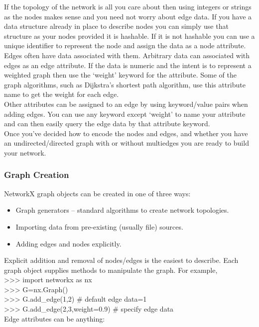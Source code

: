 If the topology of the network is all you care about then using integers or strings as the nodes makes sense and you need not worry about edge data. If you have a data structure already in place to describe nodes you can simply use that structure as your nodes provided it is hashable. If it is not hashable you can use a unique identifier to represent the node and assign the data as a node attribute.\\

Edges often have data associated with them. Arbitrary data can associated with edges as an edge attribute. If the data is numeric and the intent is to represent a weighted graph then use the ‘weight’ keyword for the attribute. Some of the graph algorithms, such as Dijkstra’s shortest path algorithm, use this attribute name to get the weight for each edge.\\

Other attributes can be assigned to an edge by using keyword/value pairs when adding edges. You can use any keyword except ‘weight’ to name your attribute and can then easily query the edge data by that attribute keyword.\\

Once you’ve decided how to encode the nodes and edges, and whether you have an undirected/directed graph with or without multiedges you are ready to build your network.\\

\subsubsection{Graph Creation}
NetworkX graph objects can be created in one of three ways:
\begin{itemize}
	\item Graph generators – standard algorithms to create network topologies.
	\item Importing data from pre-existing (usually file) sources.
	\item Adding edges and nodes explicitly.
\end{itemize}
Explicit addition and removal of nodes/edges is the easiest to describe. Each graph object supplies methods to manipulate the graph. For example,\\

>>> import networkx as nx\\
>>> G=nx.Graph()\\
>>> G.add_edge(1,2)  # default edge data=1\\
>>> G.add_edge(2,3,weight=0.9) # specify edge data\\
Edge attributes can be anything:\\

